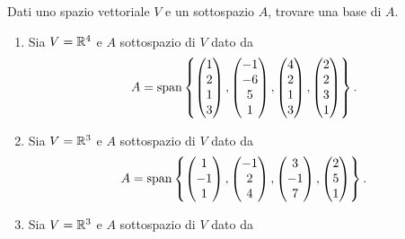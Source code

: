 \begin{exercise}
    Dati uno spazio vettoriale $V$ e un sottospazio $A$, trovare una base di $A$.
    \begin{enumerate}
        \item Sia $V = \mathbb{R}^4$ e $A$ sottospazio di $V$ dato da \[
            A = \operatorname{span}\left\{\begin{pmatrix}
                1 \\ 2 \\ 1 \\ 3
            \end{pmatrix}, \begin{pmatrix}
                -1 \\ -6 \\ 5 \\ 1
            \end{pmatrix}, \begin{pmatrix}
                4 \\ 2 \\ 1 \\ 3
            \end{pmatrix}, \begin{pmatrix}
                2 \\ 2 \\ 3 \\ 1
            \end{pmatrix}\right\}.  
        \]
        \item Sia $V = \mathbb{R}^3$ e $A$ sottospazio di $V$ dato da \[
            A = \operatorname{span}\left\{\begin{pmatrix}
                1 \\ -1 \\ 1
            \end{pmatrix}, \begin{pmatrix}
                -1 \\ 2 \\ 4
            \end{pmatrix}, \begin{pmatrix}
                3 \\ -1 \\ 7
            \end{pmatrix}, \begin{pmatrix}
                2 \\ 5 \\ 1
            \end{pmatrix}\right\}.
        \]
        \item Sia $V = \mathbb{R}^3$ e $A$ sottospazio di $V$ dato da \[
\]
\end{enumerate}
\end{exercise}
